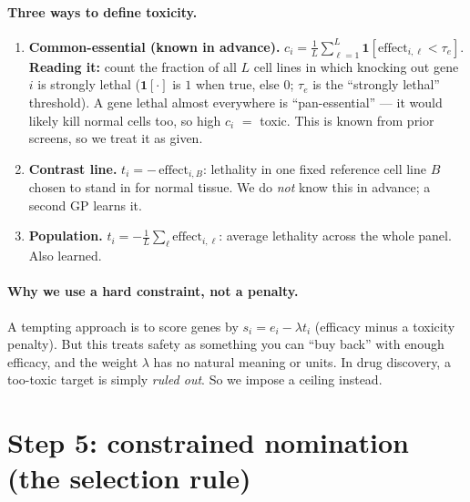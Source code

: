 \documentclass[11pt]{article}
\begin{document}
\paragraph{Three ways to define toxicity.}
\begin{enumerate}[leftmargin=2em,itemsep=2pt]
\item \textbf{Common-essential (known in advance).}
$c_i=\tfrac{1}{L}\sum_{\ell=1}^{L}\mathbf{1}[\mathrm{effect}_{i,\ell}<\tau_e]$.
\textbf{Reading it:} count the fraction of all $L$ cell lines in which knocking out gene
$i$ is strongly lethal ($\mathbf{1}[\cdot]$ is $1$ when true, else $0$; $\tau_e$ is the
``strongly lethal'' threshold). A gene lethal almost everywhere is ``pan-essential'' ---
it would likely kill normal cells too, so high $c_i$ $=$ toxic. This is known from prior
screens, so we treat it as given.
\item \textbf{Contrast line.} $t_i=-\,\mathrm{effect}_{i,B}$: lethality in one fixed
reference cell line $B$ chosen to stand in for normal tissue. We do \emph{not} know this in
advance; a second GP learns it.
\item \textbf{Population.} $t_i=-\tfrac1L\sum_\ell \mathrm{effect}_{i,\ell}$: average
lethality across the whole panel. Also learned.
\end{enumerate}

\paragraph{Why we use a hard constraint, not a penalty.} A tempting approach is to
score genes by $s_i=e_i-\lambda t_i$ (efficacy minus a toxicity penalty). But this treats
safety as something you can ``buy back'' with enough efficacy, and the weight $\lambda$ has
no natural meaning or units. In drug discovery, a too-toxic target is simply \emph{ruled
out}. So we impose a ceiling instead.

\section{Step 5: constrained nomination (the selection rule)}
\end{document}
